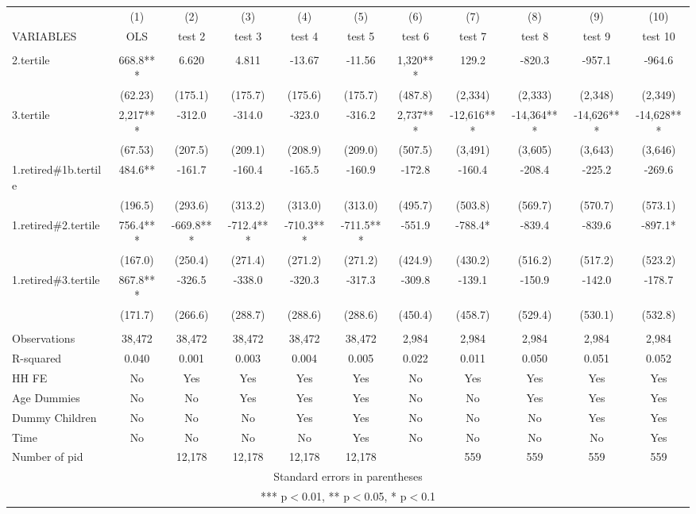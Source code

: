 \begin{tabular}{lcccccccccc} \hline
 & (1) & (2) & (3) & (4) & (5) & (6) & (7) & (8) & (9) & (10) \\
VARIABLES & OLS & test 2 & test 3 & test 4 & test 5 & test 6 & test 7 & test 8 & test 9 & test 10 \\ \hline
 &  &  &  &  &  &  &  &  &  &  \\
2.tertile & 668.8*** & 6.620 & 4.811 & -13.67 & -11.56 & 1,320*** & 129.2 & -820.3 & -957.1 & -964.6 \\
 & (62.23) & (175.1) & (175.7) & (175.6) & (175.7) & (487.8) & (2,334) & (2,333) & (2,348) & (2,349) \\
3.tertile & 2,217*** & -312.0 & -314.0 & -323.0 & -316.2 & 2,737*** & -12,616*** & -14,364*** & -14,626*** & -14,628*** \\
 & (67.53) & (207.5) & (209.1) & (208.9) & (209.0) & (507.5) & (3,491) & (3,605) & (3,643) & (3,646) \\
1.retired\#1b.tertile & 484.6** & -161.7 & -160.4 & -165.5 & -160.9 & -172.8 & -160.4 & -208.4 & -225.2 & -269.6 \\
 & (196.5) & (293.6) & (313.2) & (313.0) & (313.0) & (495.7) & (503.8) & (569.7) & (570.7) & (573.1) \\
1.retired\#2.tertile & 756.4*** & -669.8*** & -712.4*** & -710.3*** & -711.5*** & -551.9 & -788.4* & -839.4 & -839.6 & -897.1* \\
 & (167.0) & (250.4) & (271.4) & (271.2) & (271.2) & (424.9) & (430.2) & (516.2) & (517.2) & (523.2) \\
1.retired\#3.tertile & 867.8*** & -326.5 & -338.0 & -320.3 & -317.3 & -309.8 & -139.1 & -150.9 & -142.0 & -178.7 \\
 & (171.7) & (266.6) & (288.7) & (288.6) & (288.6) & (450.4) & (458.7) & (529.4) & (530.1) & (532.8) \\
 &  &  &  &  &  &  &  &  &  &  \\
Observations & 38,472 & 38,472 & 38,472 & 38,472 & 38,472 & 2,984 & 2,984 & 2,984 & 2,984 & 2,984 \\
R-squared & 0.040 & 0.001 & 0.003 & 0.004 & 0.005 & 0.022 & 0.011 & 0.050 & 0.051 & 0.052 \\
HH FE & No & Yes & Yes & Yes & Yes & No & Yes & Yes & Yes & Yes \\
Age Dummies & No & No & Yes & Yes & Yes & No & No & Yes & Yes & Yes \\
Dummy Children & No & No & No & Yes & Yes & No & No & No & Yes & Yes \\
Time & No & No & No & No & Yes & No & No & No & No & Yes \\
 Number of pid &  & 12,178 & 12,178 & 12,178 & 12,178 &  & 559 & 559 & 559 & 559 \\ \hline
\multicolumn{11}{c}{ Standard errors in parentheses} \\
\multicolumn{11}{c}{ *** p$<$0.01, ** p$<$0.05, * p$<$0.1} \\
\end{tabular}

